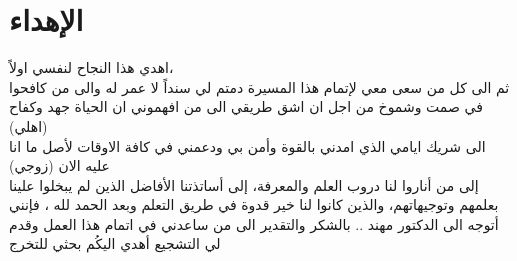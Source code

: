\chapter*{الإهداء}

\begin{center}
اهدي هذا النجاح لنفسي اولاً،\\[1cm]
ثم الى كل من سعى معي لإتمام هذا المسيرة دمتم لي سنداً لا عمر له والى من كافحوا  في صمت وشموخ  من اجل ان اشق طريقي الى من افهموني ان الحياة جهد وكفاح\\ (اهلي)\\[1cm]
الى شريك ايامي الذي امدني بالقوة وأمن بي ودعمني في كافة الاوقات لأصل ما انا عليه الان (زوجي)\\[1cm]
إلى من أناروا لنا دروب العلم والمعرفة، إلى أساتذتنا الأفاضل الذين لم يبخلوا علينا بعلمهم وتوجيهاتهم، والذين كانوا لنا خير قدوة في طريق التعلم
وبعد الحمد لله ، فإنني أتوجه الى الدكتور مهند ..
بالشكر والتقدير الى من ساعدني في اتمام هذا العمل وقدم لي التشجيع أهدي اليكُم بحثي للتخرج
\end{center}




